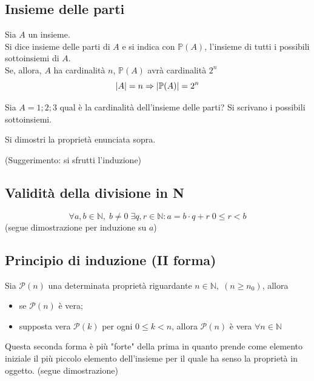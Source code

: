 \begin{flushleft}
\subsection{Insieme delle parti}
Sia $A$ un insieme.\\
Si dice insieme delle parti di $A$ e si indica con $\mathbb{P}(A)$, l'insieme di tutti i possibili sottoinsiemi di $A$.\\
Se, allora, $A$ ha cardinalità $n$, $\mathbb{P}(A)$ avrà cardinalità $2^n$
\[\abs{A} = n \Rightarrow \abs{\mathbb{P}(A)} = 2^n\]
\begin{domanda}
Sia $A={1;2;3}$ qual è la cardinalità dell'insieme delle parti? Si scrivano i possibili sottoinsiemi.
\end{domanda}
\vspace{100px}
\begin{esercizio}
Si dimostri la proprietà enunciata sopra.
\end{esercizio}
(Suggerimento: si sfrutti l'induzione)\\
\vspace{200px}

\subsection{Validità della divisione in N}
\[\forall a,b \in \mathbb{N},\;b\neq0\;\exists q,r\in\mathbb{N}: a=b\cdot q + r\;0\leq r<b\]
(segue dimostrazione per induzione su $a$)
\\ \vspace{300px}


\subsection{Principio di induzione (II forma)}
Sia $\mathcal{P}(n)$ una determinata proprietà riguardante $n\in \mathbb{N},\;(n\geq n_0)$, allora
\begin{itemize}
    \item se $\mathcal{P}(n)$ è vera;
    \item supposta vera $\mathcal{P}(k)$ per ogni $0\leq k < n$, allora $\mathcal{P}(n)$ è vera $\forall n\in \mathbb{N}$
\end{itemize}
Questa seconda forma è più "forte" della prima in quanto prende come elemento iniziale il più piccolo elemento dell'insieme per il quale ha senso la proprietà in oggetto.
(segue dimostrazione)
\\ \vspace{300px}


\end{flushleft}
